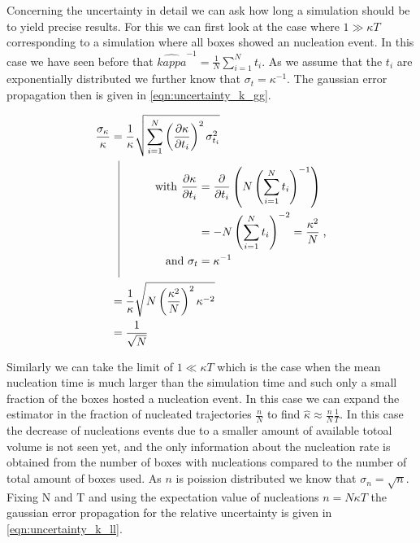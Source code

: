 Concerning the uncertainty in detail we can ask how long a simulation should be to yield precise results. For this we can first look at the case where $1 \gg \kappa T$ corresponding to a simulation where all boxes showed an nucleation event. In this case we have seen before that $\hat{kappa}^{-1} = \frac{1}{N} \sum_{i=1}^N t_i$. As we assume that the $t_i$ are exponentially distributed we further know that $\sigma_{t} = \kappa^{-1}$. The gaussian error propagation then is given in \autoref{eqn:uncertainty_k_gg}.

\begin{align}
\label{eqn:uncertainty_k_gg}
\frac{\sigma_{\kappa}}{\kappa} &=\frac{1}{\kappa} \sqrt{\sum_{i=1}^N \left( \frac{\partial \kappa}{\partial t_i} \right)^2 \sigma_{t_i}^2 }\\ 
& \; \; \, \vrule
  \begin{aligned}[t]
  \raisebox{0.9cm}{ \makebox[1cm]{}} \text{with }  \frac{\partial \kappa}{\partial t_i} &= \frac{\partial}{\partial t_i} \left( N \left( \sum_{i=1}^N t_i \right)^{-1} \right)\\
  &= -N\left( \sum_{i=1}^N t_i \right)^{-2}  = \frac{\kappa^2}{N} \; \text{,} \\
 \raisebox{-0.4cm}{ \makebox[1cm]{}} \text{and } \sigma_{t} &= \kappa^{-1}
  \end{aligned} \nonumber\\
 &= \frac{1}{\kappa} \sqrt{ N \left( \frac{\kappa^2}{N}\right)^{2} \kappa^{-2} } \\
 &= \frac{1}{\sqrt{N}}
\end{align}

Similarly we can take the limit of $1 \ll \kappa T$ which is the case when the mean nucleation time is much larger than the simulation time and such only a small fraction of the boxes hosted a nucleation event. In this case we can expand the estimator in the fraction of nucleated trajectories $\frac{n}{N}$ to find $\hat{\kappa} \approx \frac{n}{N} \frac{1}{T}$. In this case the decrease of nucleations events due to a smaller amount of available totoal volume is not seen yet, and the only information about the nucleation rate is obtained from the number of boxes with nucleations compared to the number of total amount of boxes used. As $n$ is poission distributed we know that $\sigma_n = \sqrt{n}$. Fixing N and T and using the expectation value of nucleations $n = N \kappa T$ the gaussian error propagation for the relative uncertainty is given in \autoref{eqn:uncertainty_k_ll}.

